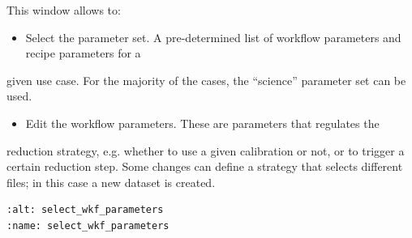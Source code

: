 \documentclass{article}
\begin{document}
This window allows to:
\begin{itemize}
\item Select the parameter set. A pre-determined list of workflow parameters and recipe parameters for a
\end{itemize}
  given use case. For the majority of the cases, the “science” parameter set can be used.
\begin{itemize}
\item Edit the workflow parameters. These are parameters that regulates the
\end{itemize}
  reduction strategy, e.g. whether to use a given calibration or not, or to trigger a certain reduction step. 
  Some changes can define a strategy that selects different files; in this case a new dataset is created.


\begin{verbatim}
:alt: select_wkf_parameters
:name: select_wkf_parameters
\end{verbatim}

            
\end{document}
